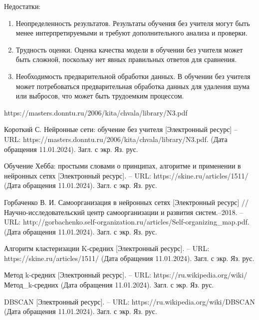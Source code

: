 \documentclass[bachelor, och, referat]{SCWorks}
\begin{document}
Недостатки:
\begin{enumerate}
    \item Неопределенность результатов. Результаты обучения без учителя могут быть менее интерпретируемыми и требуют дополнительного анализа и проверки.
    \item Трудность оценки. Оценка качества модели в обучении без учителя может быть сложной, поскольку нет явных правильных ответов для сравнения.
    \item Необходимость предварительной обработки данных. В обучении без учителя может потребоваться предварительная обработка данных для удаления шума или выбросов, что может быть трудоемким процессом.
\end{enumerate}
https://masters.donntu.ru/2006/kita/chvala/library/N3.pdf
\begin{thebibliography}{10}
    Короткий С. Нейронные сети: обучение без учителя [Электронный ресурс] -- URL: https://masters.donntu.ru/2006/kita/chvala/library/N3.pdf. (Дата обращения 11.01.2024). Загл. с экр. Яз. рус.

    Обучение Хебба: простыми словами о принципах, алгоритме и применении в нейронных сетях [Электронный ресурс]. -- URL: https://skine.ru/articles/1511/
    (Дата обращения 11.01.2024). Загл. с экр. Яз. рус.

    Горбаченко В. И. Самоорганизация в нейронных сетях [Электронный ресурс] //Научно-исследовательский центр самоорганизации и развития систем.--2018. -- URL: http://gorbachenko.self-organization.ru/articles/Self-organizing_map.pdf. (Дата обращения 11.01.2024). Загл. с экр. Яз. рус.

    Алгоритм кластеризации K-средних [Электронный ресурс]. -- URL: https://skine.ru/articles/1511/
    (Дата обращения 11.01.2024). Загл. с экр. Яз. рус.

    Метод k-средних [Электронный ресурс]. -- URL: https://ru.wikipedia.org/wiki/Метод_k-средних
    (Дата обращения 11.01.2024). Загл. с экр. Яз. рус.

    DBSCAN [Электронный ресурс]. -- URL: https://ru.wikipedia.org/wiki/DBSCAN
    (Дата обращения 11.01.2024). Загл. с экр. Яз. рус.
\end{thebibliography}
\end{document}
